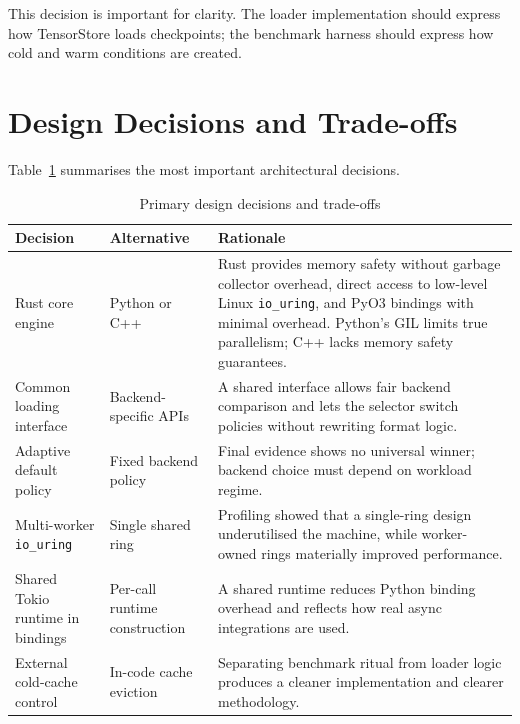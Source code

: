 This decision is important for clarity. The loader implementation should express how TensorStore loads checkpoints; the benchmark harness should express how cold and warm conditions are created.

\section{Design Decisions and Trade-offs}

Table~\ref{tab:design_decisions} summarises the most important architectural decisions.

\begin{table}
\small
\caption{Primary design decisions and trade-offs}
\label{tab:design_decisions}
\centering
\begin{tabular}{p{3cm}p{3.5cm}p{5cm}}
\toprule
\textbf{Decision} & \textbf{Alternative} & \textbf{Rationale} \\
\midrule
Rust core engine & Python or C++ & Rust provides memory safety without garbage collector overhead, direct access to low-level Linux \texttt{io\_uring}, and PyO3 bindings with minimal overhead. Python's GIL limits true parallelism; C++ lacks memory safety guarantees. \\
\midrule
Common loading interface & Backend-specific APIs & A shared interface allows fair backend comparison and lets the selector switch policies without rewriting format logic. \\
\midrule
Adaptive default policy & Fixed backend policy & Final evidence shows no universal winner; backend choice must depend on workload regime. \\
\midrule
Multi-worker \texttt{io\_uring} & Single shared ring & Profiling showed that a single-ring design underutilised the machine, while worker-owned rings materially improved performance. \\
\midrule
Shared Tokio runtime in bindings & Per-call runtime construction & A shared runtime reduces Python binding overhead and reflects how real async integrations are used. \\
\midrule
External cold-cache control & In-code cache eviction & Separating benchmark ritual from loader logic produces a cleaner implementation and clearer methodology. \\
\bottomrule
\end{tabular}
\normalsize
\end{table}
